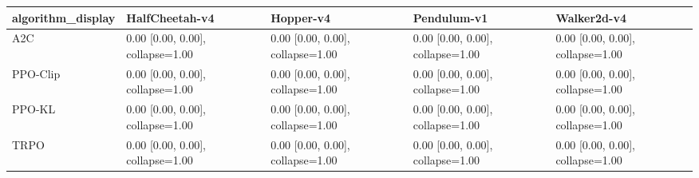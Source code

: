 \begin{tabular}{lllll}
\toprule
algorithm_display & HalfCheetah-v4 & Hopper-v4 & Pendulum-v1 & Walker2d-v4 \\
\midrule
A2C & 0.00 [0.00, 0.00], collapse=1.00 & 0.00 [0.00, 0.00], collapse=1.00 & 0.00 [0.00, 0.00], collapse=1.00 & 0.00 [0.00, 0.00], collapse=1.00 \\
PPO-Clip & 0.00 [0.00, 0.00], collapse=1.00 & 0.00 [0.00, 0.00], collapse=1.00 & 0.00 [0.00, 0.00], collapse=1.00 & 0.00 [0.00, 0.00], collapse=1.00 \\
PPO-KL & 0.00 [0.00, 0.00], collapse=1.00 & 0.00 [0.00, 0.00], collapse=1.00 & 0.00 [0.00, 0.00], collapse=1.00 & 0.00 [0.00, 0.00], collapse=1.00 \\
TRPO & 0.00 [0.00, 0.00], collapse=1.00 & 0.00 [0.00, 0.00], collapse=1.00 & 0.00 [0.00, 0.00], collapse=1.00 & 0.00 [0.00, 0.00], collapse=1.00 \\
\bottomrule
\end{tabular}
